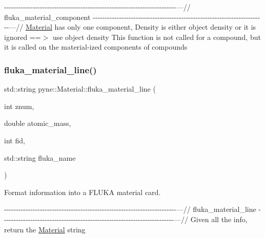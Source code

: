 -\/-\/-\/-\/-\/-\/-\/-\/-\/-\/-\/-\/-\/-\/-\/-\/-\/-\/-\/-\/-\/-\/-\/-\/-\/-\/-\/-\/-\/-\/-\/-\/-\/-\/-\/-\/-\/-\/-\/-\/-\/-\/-\/-\/-\/-\/-\/-\/-\/-\/-\/-\/-\/-\/-\/-\/-\/-\/-\/-\/-\/-\/-\/-\/-\/-\/-\/-\/-\/-\/-\/-\/---// fluka\+\_\+material\+\_\+component -\/-\/-\/-\/-\/-\/-\/-\/-\/-\/-\/-\/-\/-\/-\/-\/-\/-\/-\/-\/-\/-\/-\/-\/-\/-\/-\/-\/-\/-\/-\/-\/-\/-\/-\/-\/-\/-\/-\/-\/-\/-\/-\/-\/-\/-\/-\/-\/-\/-\/-\/-\/-\/-\/-\/-\/-\/-\/-\/-\/-\/-\/-\/-\/-\/-\/-\/-\/-\/-\/-\/-\/---// \hyperlink{classpyne_1_1_material}{Material} has only one component, Density is either object density or it is ignored ==$>$ use object density This function is not called for a compound, but it is called on the material-\/ized components of compounds \mbox{\label{classpyne_1_1_material_a269b13dac00eb3ba0ff31feb5bd3b0ca}} 
\subsubsection{\texorpdfstring{fluka\+\_\+material\+\_\+line()}{fluka\_material\_line()}}
{\footnotesize\ttfamily std\+::string pyne\+::\+Material\+::fluka\+\_\+material\+\_\+line (\begin{DoxyParamCaption}\item[{int}]{znum,  }\item[{double}]{atomic\+\_\+mass,  }\item[{int}]{fid,  }\item[{std\+::string}]{fluka\+\_\+name }\end{DoxyParamCaption})}



Format information into a F\+L\+U\+KA material card. 

-\/-\/-\/-\/-\/-\/-\/-\/-\/-\/-\/-\/-\/-\/-\/-\/-\/-\/-\/-\/-\/-\/-\/-\/-\/-\/-\/-\/-\/-\/-\/-\/-\/-\/-\/-\/-\/-\/-\/-\/-\/-\/-\/-\/-\/-\/-\/-\/-\/-\/-\/-\/-\/-\/-\/-\/-\/-\/-\/-\/-\/-\/-\/-\/-\/-\/-\/-\/-\/-\/-\/-\/---// fluka\+\_\+material\+\_\+line -\/-\/-\/-\/-\/-\/-\/-\/-\/-\/-\/-\/-\/-\/-\/-\/-\/-\/-\/-\/-\/-\/-\/-\/-\/-\/-\/-\/-\/-\/-\/-\/-\/-\/-\/-\/-\/-\/-\/-\/-\/-\/-\/-\/-\/-\/-\/-\/-\/-\/-\/-\/-\/-\/-\/-\/-\/-\/-\/-\/-\/-\/-\/-\/-\/-\/-\/-\/-\/-\/-\/-\/---// Given all the info, return the \hyperlink{classpyne_1_1_material}{Material} string \mbox{\label{classpyne_1_1_material_af3f7e0865a7a8019e02c2fb3c408c2f3}} 
